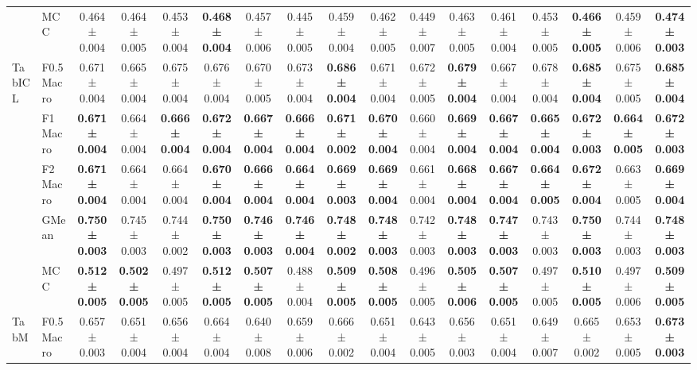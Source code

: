 \begin{table}[H]
{\begin{tabular}{llccccccccccccccc}
 & MCC & 0.464 ± 0.004 & 0.464 ± 0.005 & 0.453 ± 0.004 & \textbf{0.468 ± 0.004} & 0.457 ± 0.006 & 0.445 ± 0.005 & 0.459 ± 0.004 & 0.462 ± 0.005 & 0.449 ± 0.007 & 0.463 ± 0.005 & 0.461 ± 0.004 & 0.453 ± 0.005 & \textbf{0.466 ± 0.005} & 0.459 ± 0.006 & \textbf{0.474 ± 0.003} \\
\cline{1-17}
\multirow[t]{5}{*}{TabICL} & F0.5 Macro & 0.671 ± 0.004 & 0.665 ± 0.004 & 0.675 ± 0.004 & 0.676 ± 0.004 & 0.670 ± 0.005 & 0.673 ± 0.004 & \textbf{0.686 ± 0.004} & 0.671 ± 0.004 & 0.672 ± 0.005 & \textbf{0.679 ± 0.004} & 0.667 ± 0.004 & 0.678 ± 0.004 & \textbf{0.685 ± 0.004} & 0.675 ± 0.005 & \textbf{0.685 ± 0.004} \\
 & F1 Macro & \textbf{0.671 ± 0.004} & 0.664 ± 0.004 & \textbf{0.666 ± 0.004} & \textbf{0.672 ± 0.004} & \textbf{0.667 ± 0.004} & \textbf{0.666 ± 0.004} & \textbf{0.671 ± 0.002} & \textbf{0.670 ± 0.004} & 0.660 ± 0.004 & \textbf{0.669 ± 0.004} & \textbf{0.667 ± 0.004} & \textbf{0.665 ± 0.004} & \textbf{0.672 ± 0.003} & \textbf{0.664 ± 0.005} & \textbf{0.672 ± 0.003} \\
 & F2 Macro & \textbf{0.671 ± 0.004} & 0.664 ± 0.004 & 0.664 ± 0.004 & \textbf{0.670 ± 0.004} & \textbf{0.666 ± 0.004} & \textbf{0.664 ± 0.004} & \textbf{0.669 ± 0.003} & \textbf{0.669 ± 0.004} & 0.661 ± 0.004 & \textbf{0.668 ± 0.004} & \textbf{0.667 ± 0.004} & \textbf{0.664 ± 0.005} & \textbf{0.672 ± 0.004} & 0.663 ± 0.005 & \textbf{0.669 ± 0.004} \\
 & GMean & \textbf{0.750 ± 0.003} & 0.745 ± 0.003 & 0.744 ± 0.002 & \textbf{0.750 ± 0.003} & \textbf{0.746 ± 0.003} & \textbf{0.746 ± 0.004} & \textbf{0.748 ± 0.002} & \textbf{0.748 ± 0.003} & 0.742 ± 0.003 & \textbf{0.748 ± 0.003} & \textbf{0.747 ± 0.003} & 0.743 ± 0.003 & \textbf{0.750 ± 0.003} & 0.744 ± 0.003 & \textbf{0.748 ± 0.003} \\
 & MCC & \textbf{0.512 ± 0.005} & \textbf{0.502 ± 0.005} & 0.497 ± 0.005 & \textbf{0.512 ± 0.005} & \textbf{0.507 ± 0.005} & 0.488 ± 0.004 & \textbf{0.509 ± 0.005} & \textbf{0.508 ± 0.005} & 0.496 ± 0.005 & \textbf{0.505 ± 0.006} & \textbf{0.507 ± 0.005} & 0.497 ± 0.005 & \textbf{0.510 ± 0.005} & 0.497 ± 0.006 & \textbf{0.509 ± 0.005} \\
\cline{1-17}
\multirow[t]{5}{*}{TabM} & F0.5 Macro & 0.657 ± 0.003 & 0.651 ± 0.004 & 0.656 ± 0.004 & 0.664 ± 0.004 & 0.640 ± 0.008 & 0.659 ± 0.006 & 0.666 ± 0.002 & 0.651 ± 0.004 & 0.643 ± 0.005 & 0.656 ± 0.003 & 0.651 ± 0.004 & 0.649 ± 0.007 & 0.665 ± 0.002 & 0.653 ± 0.005 & \textbf{0.673 ± 0.003} \\

\end{tabular}}
\end{table}
